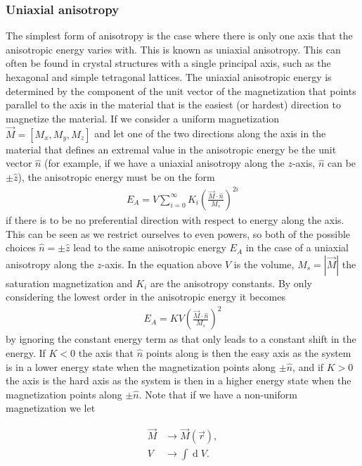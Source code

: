 \documentclass[12pt, a4paper, twoside, openright]{article}		%
\renewcommand{\d}[1]{\ensuremath{\operatorname{d}\!{#1}}}
\numberwithin{equation}{section}
\begin{document}
\subsubsection{Uniaxial anisotropy}
The simplest form of anisotropy is the case where there is only one axis that the anisotropic energy varies with. This is known as uniaxial anisotropy. This can often be found in crystal structures with a single principal axis, such as the hexagonal and simple tetragonal lattices. The uniaxial anisotropic energy is determined by the component of the unit vector of the magnetization that points parallel to the axis in the material that is the easiest (or hardest) direction to magnetize the material. If we consider a uniform magnetization $\vec{M} = \left[M_x, M_y, M_z\right]$ and let one of the two directions along the axis in the material that defines an extremal value in the anisotropic energy be the unit vector $\hat{n}$ (for example, if we have a uniaxial anisotropy along the $z$-axis, $\hat{n}$ can be $\pm\hat{z}$), the anisotropic energy must be on the form
\begin{align}
\label{eq:uniaxialanisotropy}
E_A = V \sum_{i=0}^{\infty} K_i \left(\frac{\vec{M}\cdot\hat{n}}{M_s}\right)^{2i}
\end{align}
if there is to be no preferential direction with respect to energy along the axis. This can be seen as we restrict ourselves to even powers, so both of the possible choices $\hat{n}=\pm\hat{z}$ lead to the same anisotropic energy $E_A$ in the case of a uniaxial anisotropy along the $z$-axis. In the equation above $V$ is the volume, $M_s = |\vec{M}|$ the saturation magnetization and $K_i$ are the anisotropy constants. By only considering the lowest order in the anisotropic energy it becomes
\begin{align}
\label{eq:uniaxialanisotropy_v2}
E_A = K V \left(\frac{\vec{M}\cdot\hat{n}}{M_s}\right)^2
\end{align}
by ignoring the constant energy term as that only leads to a constant shift in the energy. If $K < 0$ the axis that $\hat{n}$ points along is then the easy axis as the system is in a lower energy state when the magnetization points along $\pm\hat{n}$, and if $K > 0$ the axis is the hard axis as the system is then in a higher energy state when the magnetization points along $\pm\hat{n}$. Note that if we have a non-uniform magnetization we let

\begin{align*}
\vec{M} &\rightarrow \vec{M}(\vec{r}), \\
V &\rightarrow \int \d V.
\end{align*}
\end{document}
